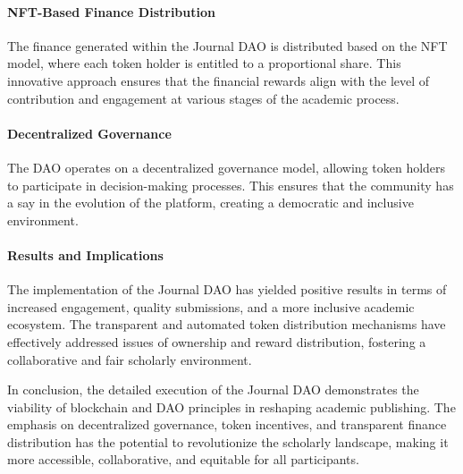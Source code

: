 \documentclass[lettersize,journal]{IEEEtran}
\begin{document}
\paragraph{NFT-Based Finance Distribution}

The finance generated within the Journal DAO is distributed based on the NFT model, where each token holder is entitled to a proportional share. This innovative approach ensures that the financial rewards align with the level of contribution and engagement at various stages of the academic process.

\paragraph{Decentralized Governance}

The DAO operates on a decentralized governance model, allowing token holders to participate in decision-making processes. This ensures that the community has a say in the evolution of the platform, creating a democratic and inclusive environment.

\paragraph{Results and Implications}

The implementation of the Journal DAO has yielded positive results in terms of increased engagement, quality submissions, and a more inclusive academic ecosystem. The transparent and automated token distribution mechanisms have effectively addressed issues of ownership and reward distribution, fostering a collaborative and fair scholarly environment.

In conclusion, the detailed execution of the Journal DAO demonstrates the viability of blockchain and DAO principles in reshaping academic publishing. The emphasis on decentralized governance, token incentives, and transparent finance distribution has the potential to revolutionize the scholarly landscape, making it more accessible, collaborative, and equitable for all participants.
\end{document}

